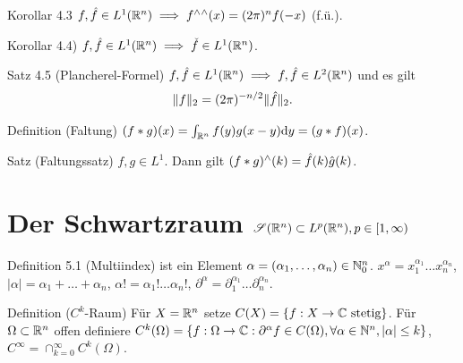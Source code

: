 \begin{namedtheorem}{Korollar 4.3}
  $f,\hat{f}\in L^1(\mathbb{R}^n) \implies f{}^{\wedge}{}^{\wedge}(x) = (2\pi)^nf(-x)$ (f.ü.).
\end{namedtheorem}

\begin{namedtheorem}{Korollar 4.4)}
  $f,\hat{f}\in L^1(\mathbb{R}^n) \implies \check{f}\in L^1(\mathbb{R}^n)$.
\end{namedtheorem}

\begin{namedtheorem}{Satz 4.5 (Plancherel-Formel)}
  $f,\hat{f}\in L^1(\mathbb{R}^n) \implies f,\hat{f}\in L^2(\mathbb{R}^n)$ und es gilt 
\begin{align*}
	\lVert f\rVert_2 = (2\pi)^{-n/2}\lVert\hat{f}\rVert_2.
\end{align*}
\end{namedtheorem}

\begin{namedtheorem}{Definition (Faltung)}
  $(f\ast g)(x)=\int_{\mathbb{R}^n}f(y)g(x-y)\mathrm{d} y = (g\ast f)(x)$.
\end{namedtheorem}

\begin{namedtheorem}{Satz (Faltungssatz)}
  $f,g\in L^1$. Dann gilt $(f\ast g){}^{\wedge}(k)=\hat{f}(k)\hat{g}(k)$.
\end{namedtheorem}

\section{Der Schwartzraum $\mathscr{S}(\mathbb{R}^n)\subset L^p(\mathbb{R}^n),p\in [1,\infty)$}

\begin{namedtheorem}{Definition 5.1 (Multiindex)}
  ist ein Element $\alpha = (\alpha_1, \ldots, \alpha_n)\in\mathbb{N}^n_0$. $x^{\alpha} = x_1^{\alpha_1} \ldots x_n^{\alpha_n}$, $|\alpha| = \alpha_1 + \ldots + \alpha_n$, $\alpha! = \alpha_1! \ldots \alpha_n!$, $\partial^{\alpha} = \partial_1^{\alpha_1} \ldots \partial_n^{\alpha_n}$.
\end{namedtheorem}

\begin{namedtheorem}{Definition ($C^k$-Raum)}
  Für $X=\mathbb{R}^n$ setze $C(X) = \{f: X \rightarrow \C\ \text{stetig}\}$. Für $\Omega\subset\mathbb{R}^n$ offen definiere $C^k(\Omega) = \{f:\Omega\rightarrow\mathbb{C}:\partial^{\alpha}f \in C(\Omega), \forall\alpha\in\mathbb{N}^n,|\alpha|\leq k\}$, $C^{\infty} = \cap_{k=0}^{\infty} C^k(\Omega)$.
\end{namedtheorem}

